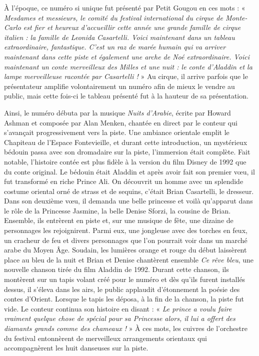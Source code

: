 À l’époque, ce numéro si unique fut présenté par Petit Gougou en ces mots : «\textit{ Mesdames et messieurs, le comité du festival international du cirque de Monte-Carlo est fier et heureux d’accueillir cette année une grande famille de cirque italien : la famille de Leonida Casartelli. Voici maintenant dans un tableau extraordinaire, fantastique. C’est un raz de marée humain qui va arriver maintenant dans cette piste et également une arche de Noé extraordinaire. Voici maintenant un conte merveilleux des Milles et une nuit : le conte d’Aladdin et la lampe merveilleuse racontée par Casartelli !} » Au cirque, il arrive parfois que le présentateur amplifie volontairement un numéro afin de mieux le vendre au public, mais cette fois-ci le tableau présenté fut à la hauteur de sa présentation. 

Ainsi, le numéro débuta par la musique \textit{Nuits d’Arabie}, écrite par Howard Ashman et composée par Alan Menken, chantée en direct par le conteur qui s’avançait progressivement vers la piste. Une ambiance orientale emplit le Chapiteau de l’Espace Fontevieille, et durant cette introduction, un mystérieux bédouin passa avec son dromadaire sur la piste, l’immersion était complète. Fait notable, l’histoire contée est plus fidèle à la version du film Disney de 1992 que du conte original. Le bédouin était Aladdin et après avoir fait son premier vœu, il fut transformé en riche Prince Ali. On découvrit un homme avec un splendide costume oriental orné de strass et de sequins, c’était Brian Casartelli, le dresseur. Dans son deuxième vœu, il demanda une belle princesse et voilà qu’apparut dans le rôle de la Princesse Jasmine, la belle Denise Sforzi, la cousine de Brian. Ensemble, ils entrèrent en piste et, sur une musique de fête, une dizaine de personnages les rejoignirent. Parmi eux, une jongleuse avec des torches en feux, un cracheur de feu et divers personnages que l’on pourrait voir dans un marché arabe du Moyen Âge. Soudain, les lumières orange et rouge du début laissèrent place au bleu de la nuit et Brian et Denise chantèrent ensemble \textit{Ce rêve bleu}, une nouvelle chanson tirée du film Aladdin de 1992. Durant cette chanson, ils montèrent sur un tapis volant créé pour le numéro et dès qu’ils furent installés dessus, il s’éleva dans les airs, le public applaudit d’étonnement la poésie des contes d’Orient. Lorsque le tapis les déposa, à la fin de la chanson, la piste fut vide. Le conteur continua son histoire en disant : « \textit{Le prince a voulu faire vraiment quelque chose de spécial pour sa Princesse alors, il lui a offert des diamants grands comme des chameaux !} » À ces mots, les cuivres de l’orchestre du festival entonnèrent de merveilleux arrangements orientaux qui accompagnèrent les huit danseuses sur la piste. 


